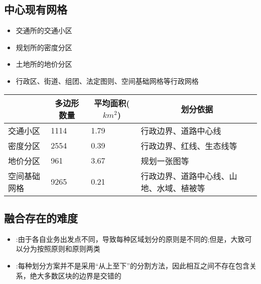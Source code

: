 \documentclass{beamerthemeMono}
\begin{document}
\subsection{中心现有网格}
\begin{frame}[t]{\subsecname}
\begin{itemize}
\item 交通所的交通小区
\item 规划所的密度分区
\item 土地所的地价分区
\item 行政区、街道、组团、法定图则、空间基础网格等行政网格
\end{itemize}

\begin{table} \centering \scriptsize
  \renewcommand\arraystretch{0.9}
  \begin{tabular}{|m{}|m{}|m{}|m{}|}
    \toprule
    \rowcolor{LightCyan}
\multicolumn{1}{|c|}{\textbf{名称}} & \multicolumn{1}{c|}{\textbf{多边形数量}} & \multicolumn{1}{c|}{\textbf{平均面积($km^2$)}} &\multicolumn{1}{c|}{\textbf{划分依据}}\\\hline
        交通小区 & 1114 & 1.79 & 行政边界、道路中心线 \\\hline
        密度分区 & 2554 & 0.39 & 行政边界、红线、生态线等\\\hline
        地价分区 & 961 & 3.67 & 规划一张图等\\\hline
        空间基础网格 &  9265 & 0.21 & 行政边界、道路中心线、山地、水域、植被等\\ 
    \bottomrule 
  \end{tabular}
\end{table}
\end{frame}

\subsection{融合存在的难度}
\begin{frame}[t]{\subsecname}
\begin{itemize}
\item<1-> :由于各自业务出发点不同，导致每种区域划分的原则是不同的;但是，大致可以分为按照原则和原则两类
\item<2-> :每种划分方案并不是采用``从上至下''的分割方法，因此相互之间不存在包含关系，绝大多数区块的边界是交错的
\end{itemize}

\begin{overlayarea}{\textwidth}{\textheight}
\end{overlayarea}
\end{frame}
\end{document}
